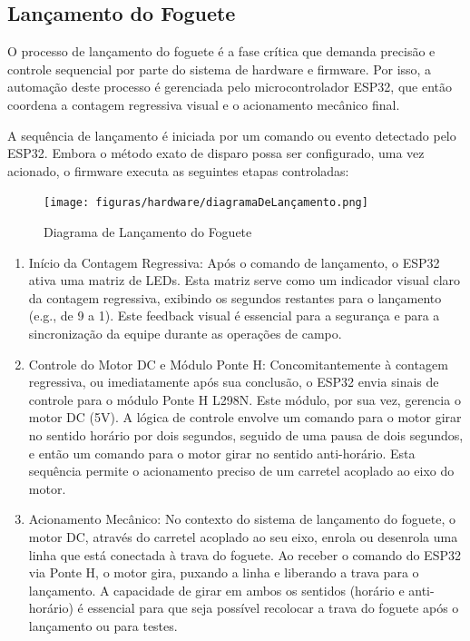 
\subsection{Lançamento do Foguete}
O processo de lançamento do foguete é a  fase crítica que demanda precisão e controle sequencial por parte do sistema de hardware e firmware. Por isso, a automação deste processo é gerenciada pelo microcontrolador ESP32, que então coordena a contagem regressiva visual e o acionamento mecânico final.

A sequência de lançamento é iniciada por um comando ou evento detectado pelo ESP32. Embora o método exato de disparo possa ser configurado, uma vez acionado, o firmware executa as seguintes etapas controladas:

\begin{figure}[H]
    \centering
    \texttt{[image: figuras/hardware/diagramaDeLançamento.png]}
    \caption{Diagrama de Lançamento do Foguete}
    \label{fig:diagrama_lancamento}
\end{figure}

\begin{enumerate}
    \item Início da Contagem Regressiva: Após o comando de lançamento, o ESP32 ativa uma matriz de LEDs. Esta matriz serve como um indicador visual claro da contagem regressiva, exibindo os segundos restantes para o lançamento (e.g., de 9 a 1). Este feedback visual é essencial para a segurança e para a sincronização da equipe durante as operações de campo.
    \item Controle do Motor DC e Módulo Ponte H: Concomitantemente à contagem regressiva, ou imediatamente após sua conclusão, o ESP32 envia sinais de controle para o módulo Ponte H L298N. Este módulo, por sua vez, gerencia o motor DC (5V). A lógica de controle envolve um comando para o motor girar no sentido horário por dois segundos, seguido de uma pausa de dois segundos, e então um comando para o motor girar no sentido anti-horário. Esta sequência permite o acionamento preciso de um carretel acoplado ao eixo do motor.
    \item Acionamento Mecânico: No contexto do sistema de lançamento do foguete, o motor DC, através do carretel acoplado ao seu eixo, enrola ou desenrola uma linha que está conectada à trava do foguete. Ao receber o comando do ESP32 via Ponte H, o motor gira, puxando a linha e liberando a trava para o lançamento. A capacidade de girar em ambos os sentidos (horário e anti-horário) é essencial para que seja possível recolocar a trava do foguete após o lançamento ou para testes.
\end{enumerate}



